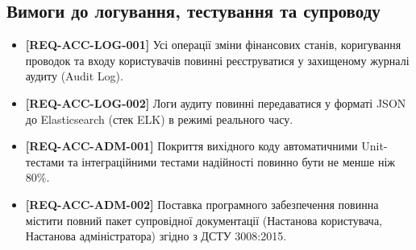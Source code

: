 \documentclass{article}
\begin{document}
\subsection{Вимоги до логування, тестування та супроводу}
\begin{itemize}
    \item \textbf{[REQ-ACC-LOG-001]} Усі операції зміни фінансових станів, коригування проводок та входу користувачів повинні реєструватися у захищеному журналі аудиту (Audit Log).
    \item \textbf{[REQ-ACC-LOG-002]} Логи аудиту повинні передаватися у форматі JSON до Elasticsearch (стек ELK) в режимі реального часу.
    \item \textbf{[REQ-ACC-ADM-001]} Покриття вихідного коду автоматичними Unit-тестами та інтеграційними тестами надійності повинно бути не менше ніж 80\%.
    \item \textbf{[REQ-ACC-ADM-002]} Поставка програмного забезпечення повинна містити повний пакет супровідної документації (Настанова користувача, Настанова адміністратора) згідно з ДСТУ 3008:2015.
\end{itemize}
\end{document}
